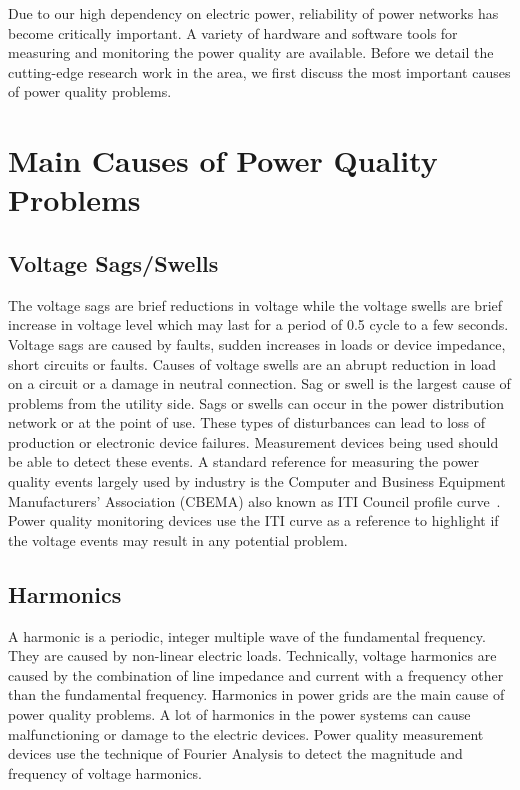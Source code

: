 \label{chap:review}
Due to our high dependency on electric power, reliability of power networks has become critically important. A variety of hardware and software tools for measuring and monitoring the power quality are available. Before we detail the cutting-edge research work in the area, we first discuss the most important causes of power quality problems.

\section{Main Causes of Power Quality Problems}
\subsection{Voltage Sags/Swells}
The voltage sags are brief reductions in voltage while the voltage swells are brief increase in voltage level which may last for a period of 0.5 cycle to a few seconds. Voltage sags are caused by faults, sudden increases in loads or device impedance, short circuits or faults. Causes of voltage swells are an abrupt reduction in load on a circuit or a damage in neutral connection. Sag or swell is the largest cause of problems from the utility side. Sags or swells can occur in the power distribution network or at the point of use. These types of disturbances can lead to loss of production or electronic device failures. Measurement devices being used should be able to detect these events. A standard reference for measuring the power quality events largely used by industry is the Computer and Business Equipment Manufacturers' Association (CBEMA) also known as ITI Council profile curve~\cite{iti_curve}. Power quality monitoring devices use the ITI curve as a reference to highlight if the voltage events may result in any potential problem.

\subsection{Harmonics}
A harmonic is a periodic, integer multiple wave of the fundamental frequency. They are caused by non-linear electric loads. Technically, voltage harmonics are caused by the combination of line impedance and current with a frequency other than the fundamental frequency. Harmonics in power grids are the main cause of power quality problems. A lot of harmonics in the power systems can cause malfunctioning or damage to the electric devices. Power quality measurement devices use the technique of Fourier Analysis to detect the magnitude and frequency of voltage harmonics.

